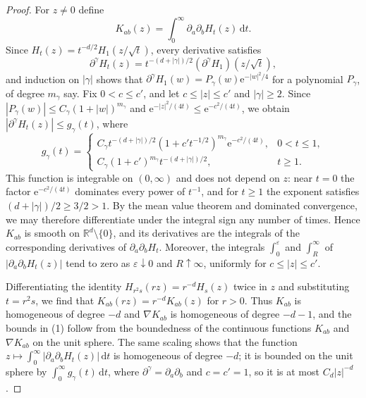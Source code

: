 \begin{proof}
For $z\neq0$ define
\[
 K_{ab}(z)=\int_0^\infty\partial_a\partial_bH_t(z)\,\mathrm d t.
\]
Since $H_t(z)=t^{-d/2}H_1(z/\sqrt t)$, every derivative satisfies
\[
 \partial^\gamma H_t(z)=t^{-(d+|\gamma|)/2}(\partial^\gamma H_1)(z/\sqrt t),
\]
and induction on $|\gamma|$ shows that $\partial^\gamma H_1(w)=P_\gamma(w)\mathrm e^{-|w|^2/4}$ for a polynomial $P_\gamma$, of degree $m_\gamma$ say. Fix $0<c\leq c'$, and let $c\leq|z|\leq c'$ and $|\gamma|\geq2$. Since $|P_\gamma(w)|\leq C_\gamma(1+|w|)^{m_\gamma}$ and $\mathrm e^{-|z|^2/(4t)}\leq\mathrm e^{-c^2/(4t)}$, we obtain $|\partial^\gamma H_t(z)|\leq g_\gamma(t)$, where
\[
 g_\gamma(t)=\begin{cases}
 C_\gamma t^{-(d+|\gamma|)/2}(1+c't^{-1/2})^{m_\gamma}\mathrm e^{-c^2/(4t)}, & 0<t\leq1,\\
 C_\gamma(1+c')^{m_\gamma}t^{-(d+|\gamma|)/2}, & t\geq1.
 \end{cases}
\]
This function is integrable on $(0,\infty)$ and does not depend on $z$: near $t=0$ the factor $\mathrm e^{-c^2/(4t)}$ dominates every power of $t^{-1}$, and for $t\geq1$ the exponent satisfies $(d+|\gamma|)/2\geq3/2>1$. By the mean value theorem and dominated convergence, we may therefore differentiate under the integral sign any number of times. Hence $K_{ab}$ is smooth on $\mathbb R^d\setminus\{0\}$, and its derivatives are the integrals of the corresponding derivatives of $\partial_a\partial_bH_t$. Moreover, the integrals $\int_0^\varepsilon$ and $\int_R^\infty$ of $|\partial_a\partial_bH_t(z)|$ tend to zero as $\varepsilon\downarrow0$ and $R\uparrow\infty$, uniformly for $c\leq|z|\leq c'$.

Differentiating the identity $H_{r^2s}(rz)=r^{-d}H_s(z)$ twice in $z$ and substituting $t=r^2s$, we find that $K_{ab}(rz)=r^{-d}K_{ab}(z)$ for $r>0$. Thus $K_{ab}$ is homogeneous of degree $-d$ and $\nabla K_{ab}$ is homogeneous of degree $-d-1$, and the bounds in (1) follow from the boundedness of the continuous functions $K_{ab}$ and $\nabla K_{ab}$ on the unit sphere. The same scaling shows that the function $z\mapsto\int_0^\infty|\partial_a\partial_bH_t(z)|\,\mathrm d t$ is homogeneous of degree $-d$; it is bounded on the unit sphere by $\int_0^\infty g_\gamma(t)\,\mathrm d t$, where $\partial^\gamma=\partial_a\partial_b$ and $c=c'=1$, so it is at most $C_d|z|^{-d}$.


\end{proof}
